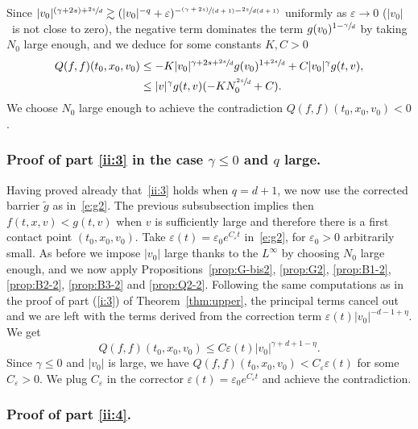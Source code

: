 \documentclass[11pt]{article}
\newcommand{\pspfrac}[2]{\sfrac{(#1)}{(#2)}}
\theoremstyle{plain}
\theoremstyle{definition}
\numberwithin{equation}{section}
\newcommand{\eps}{\varepsilon}
\newcommand{\Ao}{N_0}
\begin{document}
Since
$|v_0|^{(\gamma+2s)+\sfrac{2s}d} \gtrsim (|v_0|^{-q} +
\eps)^{-\pspfrac{\gamma+2s}{d+1} - \sfrac{2s}{d(d+1)}}$ uniformly as
$\eps \to 0$ ($|v_0|$~is not close to zero), the negative term
dominates the term $g(v_0)^{1-\sfrac{\gamma}{d}}$ by taking $\Ao$ large
enough, and we deduce for some constants $K,C>0$
\begin{align*}
Q(f,f)(t_0,x_0,v_0) &\leq -K |v_0|^{\gamma+2s+\sfrac{2s}d} g(v_0)^{1+\sfrac{2s}d} + C |v_0|^{\gamma} g(t,v), \\
&\leq |v|^{\gamma} g(t,v)( -K \Ao^{\sfrac{2s}d} + C).
\end{align*}
We choose $\Ao$ large enough to achieve the contradiction
$Q(f,f)(t_0,x_0,v_0) <0$.

\subsubsection{Proof of part \eqref{ii:3} in the case $\gamma \le 0$
and $q$ large.}

Having proved already that~\eqref{ii:3} holds when $q=d+1$, we now
use the corrected barrier $\tilde g$ as in~\eqref{e:g2}. The
previous subsubsection implies then $f(t,x,v) < g(t,v)$ when $v$ is
sufficiently large and therefore there is a first contact point
$(t_0,x_0,v_0)$. Take $\eps(t) = \eps_0e^{C_\eps t}$
in~\eqref{e:g2}, for $\eps_0>0$ arbitrarily small. As before we
impose $|v_0|$ large thanks to the $L^\infty$ by choosing $\Ao$
large enough, and we now apply Propositions~\ref{prop:G-bis2},
\ref{prop:G2}, \ref{prop:B1-2}, \ref{prop:B2-2}, \ref{prop:B3-2} and
\ref{prop:Q2-2}. Following the same computations as in the proof of
part (\ref{i:3}) of Theorem~\ref{thm:upper}, the principal terms
cancel out and we are left with the terms derived from the
correction term $\eps(t) |v_0|^{-d-1+\eta}$. We get
\[
Q(f,f)(t_0,x_0,v_0) \leq C \eps(t) |v_0|^{\gamma+d+1-\eta}.
\]
Since $\gamma\leq 0$ and $|v_0|$ is large, we have
$Q(f,f)(t_0,x_0,v_0) < C_\eps \eps(t)$ for some $C_\eps >0$. We
plug $C_\eps$ in the corrector
$\eps(t) = \eps_0 e^{C_\eps t}$ and achieve the contradiction.

\subsubsection{Proof of part \eqref{ii:4}.}
\end{document}
